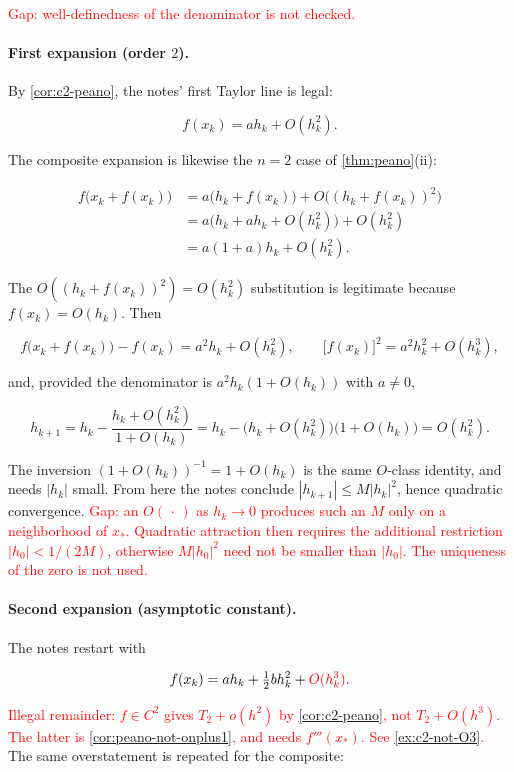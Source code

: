 \documentclass[11pt,a4paper]{article}
\newcommand{\mserr}[1]{\textcolor{red}{#1}}
\begin{document}
\mserr{Gap: well-definedness of the denominator is not checked.}

\paragraph{First expansion (order \(2\)).}
By \cref{cor:c2-peano}, the notes' first Taylor line is legal:

\[
f(x_{k})
=
a h_{k}+O(h_{k}^{2}).
\]

The composite expansion is likewise the \(n=2\) case of \cref{thm:peano}(ii):

\[
\begin{aligned}
f\bigl(x_{k}+f(x_{k})\bigr)
&=
a\bigl(h_{k}+f(x_{k})\bigr)
+
O\bigl((h_{k}+f(x_{k}))^{2}\bigr)
\\
&=
a\bigl(h_{k}+a h_{k}+O(h_{k}^{2})\bigr)
+
O(h_{k}^{2})
\\
&=
a(1+a)h_{k}+O(h_{k}^{2}).
\end{aligned}
\]

The \(O((h_{k}+f(x_{k}))^{2})=O(h_{k}^{2})\) substitution is legitimate because \(f(x_{k})=O(h_{k})\). Then

\[
f\bigl(x_{k}+f(x_{k})\bigr)-f(x_{k})
=
a^{2} h_{k}+O(h_{k}^{2}),
\qquad
\bigl[f(x_{k})\bigr]^{2}
=
a^{2} h_{k}^{2}+O(h_{k}^{3}),
\]

and, provided the denominator is \(a^{2}h_{k}(1+O(h_{k}))\) with \(a\neq 0\),

\[
h_{k+1}
=
h_{k}
-
\frac{h_{k}+O(h_{k}^{2})}{1+O(h_{k})}
=
h_{k}
-
\bigl(h_{k}+O(h_{k}^{2})\bigr)\bigl(1+O(h_{k})\bigr)
=
O(h_{k}^{2}).
\]

The inversion \((1+O(h_{k}))^{-1}=1+O(h_{k})\) is the same \(O\)-class identity, and needs \(|h_{k}|\) small. From here the notes conclude \(|h_{k+1}|\le M|h_{k}|^{2}\), hence quadratic convergence. \mserr{Gap: an \(O(\,\cdot\,)\) as \(h_{k}\to 0\) produces such an \(M\) only on a neighborhood of \(x_{*}\). Quadratic attraction then requires the additional restriction \(|h_{0}|<1/(2M)\), otherwise \(M|h_{0}|^{2}\) need not be smaller than \(|h_{0}|\). The uniqueness of the zero is not used.}

\paragraph{Second expansion (asymptotic constant).}
The notes restart with

\[
f(x_{k})
=
a h_{k}+\tfrac12 b h_{k}^{2}
+
\mserr{O(h_{k}^{3})}.
\]

\mserr{Illegal remainder: \(f\in C^{2}\) gives \(T_{2}+o(h^{2})\) by \cref{cor:c2-peano}, not \(T_{2}+O(h^{3})\). The latter is \cref{cor:peano-not-onplus1}, and needs \(f'''(x_{*})\). See \cref{ex:c2-not-O3}.} The same overstatement is repeated for the composite:
\end{document}
